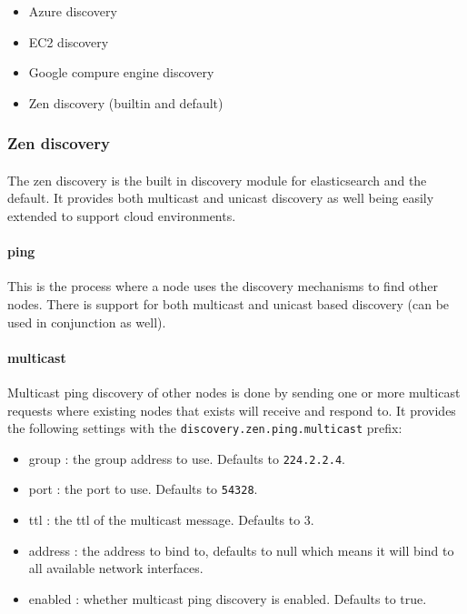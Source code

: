 \documentclass{article}%
\begin{document}
\begin{itemize}
	\item Azure discovery
	\item EC2 discovery
	\item Google compure engine discovery
	\item Zen discovery (builtin and default)
\end{itemize}

\subsubsection{Zen discovery}

\paragraph{} The zen discovery is the built in discovery module for elasticsearch and the default. It provides both multicast and unicast discovery as well being easily extended to support cloud environments.

\paragraph{ping} This is the process where a node uses the discovery mechanisms to find other nodes. There is support for both multicast and unicast based discovery (can be used in conjunction as well).

\paragraph{multicast} Multicast ping discovery of other nodes is done by sending one or more multicast requests where existing nodes that exists will receive and respond to. It provides the following settings with the \texttt{discovery.zen.ping.multicast} prefix:

\begin{itemize}
	\item group : the group address to use. Defaults to \texttt{224.2.2.4}.
	\item port : the port to use. Defaults to \texttt{54328}.
	\item ttl : the ttl of the multicast message. Defaults to 3.
	\item address : the address to bind to, defaults to null which means it will bind to all available network interfaces.
	\item enabled : whether multicast ping discovery is enabled. Defaults to true.
\end{itemize}
\end{document}
